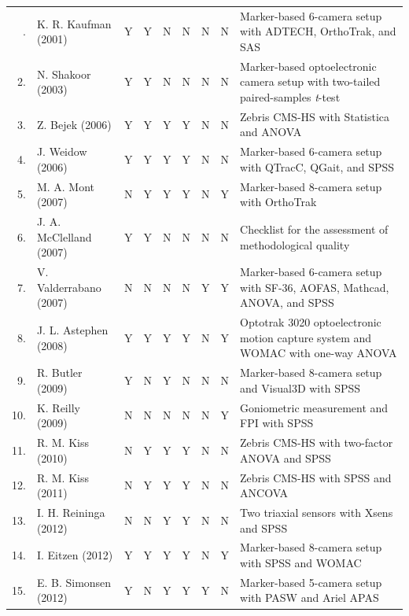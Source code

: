 \begin{longtable}{@{}r >{\raggedright\arraybackslash}p{3.55cm}
    *{6}{c} >{\raggedright\arraybackslash}p{8.55cm}@{}}
\endhead
\midrule
\endfoot
\bottomrule
\endlastfoot
1. & K. R. Kaufman \cite{kaufman2001gait} (2001) & Y & Y & N & N & N & N & Marker-based 6-camera setup with ADTECH, OrthoTrak, and SAS \\
2. & N. Shakoor \cite{shakoor2003asymmetric} (2003) & Y & Y & N & N & N & N & Marker-based optoelectronic camera setup with two-tailed paired-samples \textit{t}-test \\
3. & Z. Bejek \cite{bejek2006influence} (2006) & Y & Y & Y & Y & N & N & Zebris CMS-HS with Statistica and ANOVA \\
4. & J. Weidow \cite{weidow2006hip} (2006) & Y & Y & Y & Y & N & N & Marker-based 6-camera setup with QTracC, QGait, and SPSS \\
5. & M. A. Mont \cite{mont2007gait} (2007) & N & Y & Y & Y & N & Y & Marker-based 8-camera setup with OrthoTrak \\
6. & J. A. McClelland \cite{mcclelland2007gait} (2007) & Y & Y & N & N & N & N & Checklist for the assessment of methodological quality \\
7. & V. Valderrabano \cite{valderrabano2007gait} (2007) & N & N & N & N & Y & Y & Marker-based 6-camera setup with SF-36, AOFAS, Mathcad, ANOVA, and SPSS \\
8. & J. L. Astephen \cite{astephen2008biomechanical} (2008) & Y & Y & Y & Y & N & Y & Optotrak 3020 optoelectronic motion capture system and WOMAC with one-way ANOVA \\
9. & R. Butler \cite{butler2009gait} (2009) & Y & N & Y & N & N & N & Marker-based 8-camera setup and Visual3D with SPSS \\
10. & K. Reilly \cite{reilly2009role} (2009) & N & N & N & N & N & Y & Goniometric measurement and FPI with SPSS \\
11. & R. M. Kiss \cite{kiss2010effect} (2010) & N & Y & Y & Y & N & N & Zebris CMS-HS with two-factor ANOVA and SPSS \\
12. & R. M. Kiss \cite{kiss2011effect} (2011) & N & Y & Y & Y & N & N & Zebris CMS-HS with SPSS and ANCOVA \\
13. & I. H. Reininga \cite{reininga2012subjects} (2012) & N & N & Y & Y & N & N & Two triaxial sensors with Xsens and SPSS \\
14. & I. Eitzen \cite{eitzen2012sagittal} (2012) & Y & Y & Y & Y & N & Y & Marker-based 8-camera setup with SPSS and WOMAC \\
15. & E. B. Simonsen \cite{simonsen2012gait} (2012) & Y & N & Y & Y & Y & N & Marker-based 5-camera setup with PASW and Ariel APAS \\

\end{longtable}
